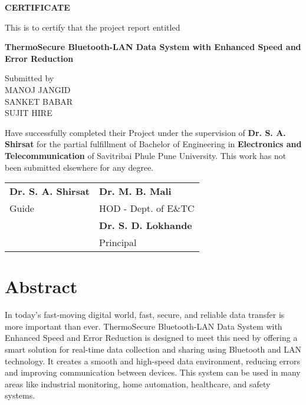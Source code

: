 \documentclass[12pt]{report}
\newcommand{\projecttitle}{ThermoSecure Bluetooth-LAN Data System with Enhanced Speed and Error Reduction}
\begin{document}
\newpage
\thispagestyle{empty}
\centering

\textbf{\Large CERTIFICATE}\\
\vspace{1cm}

This is to certify that the project report entitled\\
\vspace{0.5cm}

\textbf{\projecttitle}\\
\vspace{1cm}

Submitted by\\
\vspace{0.5cm}
MANOJ JANGID\\
SANKET BABAR\\
SUJIT HIRE\\
\vspace{1cm}

Have successfully completed their Project under the supervision of \textbf{Dr. S. A. Shirsat} for the partial fulfillment of Bachelor of Engineering in \textbf{Electronics and Telecommunication} of Savitribai Phule Pune University. This work has not been submitted elsewhere for any degree.\\
\vspace{1.5cm}

\begin{tabular}{l l}
    \textbf{Dr. S. A. Shirsat} & \textbf{Dr. M. B. Mali} \\
    Guide & HOD - Dept. of E\&TC \\[1cm]
    & \textbf{Dr. S. D. Lokhande} \\
    & Principal \\
\end{tabular}
\vfill




\tableofcontents
\newpage

\listoffigures
\newpage

\listoftables
\newpage

\chapter*{Abstract}
In today's fast-moving digital world, fast, secure, and reliable data transfer is more important than ever. ThermoSecure Bluetooth-LAN Data System with Enhanced Speed and Error Reduction is designed to meet this need by offering a smart solution for real-time data collection and sharing using Bluetooth and LAN technology. It creates a smooth and high-speed data environment, reducing errors and improving communication between devices. This system can be used in many areas like industrial monitoring, home automation, healthcare, and safety systems.
\end{document}
